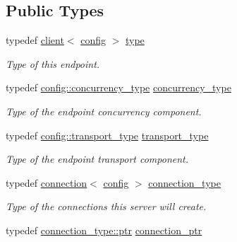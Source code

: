 \subsection*{Public Types}
\begin{DoxyCompactItemize}
\item 
typedef \hyperlink{classwebsocketpp_1_1client}{client}$<$ \hyperlink{classconfig}{config} $>$ \hyperlink{classwebsocketpp_1_1client_a8da6c7d382f7cae9567a7a1f1f2dd666}{type}\hypertarget{classwebsocketpp_1_1client_a8da6c7d382f7cae9567a7a1f1f2dd666}{}\label{classwebsocketpp_1_1client_a8da6c7d382f7cae9567a7a1f1f2dd666}

\begin{DoxyCompactList}\small\item\em Type of this endpoint. \end{DoxyCompactList}\item 
typedef \hyperlink{classwebsocketpp_1_1concurrency_1_1none}{config\+::concurrency\+\_\+type} \hyperlink{classwebsocketpp_1_1client_a404ec215508a5553d3a2295fdd82977e}{concurrency\+\_\+type}\hypertarget{classwebsocketpp_1_1client_a404ec215508a5553d3a2295fdd82977e}{}\label{classwebsocketpp_1_1client_a404ec215508a5553d3a2295fdd82977e}

\begin{DoxyCompactList}\small\item\em Type of the endpoint concurrency component. \end{DoxyCompactList}\item 
typedef \hyperlink{classwebsocketpp_1_1transport_1_1asio_1_1endpoint}{config\+::transport\+\_\+type} \hyperlink{classwebsocketpp_1_1client_a042957cf1c89e7a4c39cf1ec26046e2d}{transport\+\_\+type}\hypertarget{classwebsocketpp_1_1client_a042957cf1c89e7a4c39cf1ec26046e2d}{}\label{classwebsocketpp_1_1client_a042957cf1c89e7a4c39cf1ec26046e2d}

\begin{DoxyCompactList}\small\item\em Type of the endpoint transport component. \end{DoxyCompactList}\item 
typedef \hyperlink{classwebsocketpp_1_1connection}{connection}$<$ \hyperlink{classconfig}{config} $>$ \hyperlink{classwebsocketpp_1_1client_a29c9f0410ed33a331faac19f8efea874}{connection\+\_\+type}\hypertarget{classwebsocketpp_1_1client_a29c9f0410ed33a331faac19f8efea874}{}\label{classwebsocketpp_1_1client_a29c9f0410ed33a331faac19f8efea874}

\begin{DoxyCompactList}\small\item\em Type of the connections this server will create. \end{DoxyCompactList}\item 
typedef \hyperlink{classwebsocketpp_1_1connection_ab910d42e3bde91546183cc54642f32ab}{connection\+\_\+type\+::ptr} \hyperlink{classwebsocketpp_1_1client_a2e187bbb2beac676bbfbc2e8065de83e}{connection\+\_\+ptr}\hypertarget{classwebsocketpp_1_1client_a2e187bbb2beac676bbfbc2e8065de83e}{}\label{classwebsocketpp_1_1client_a2e187bbb2beac676bbfbc2e8065de83e}


\end{DoxyCompactItemize}
